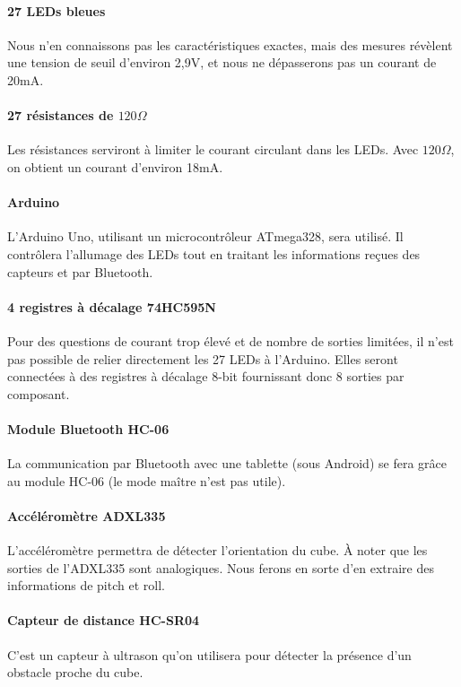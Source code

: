 \documentclass{article}
\begin{document}
\paragraph{27 LEDs bleues}
Nous n'en connaissons pas les caractéristiques exactes, mais des mesures révèlent une tension de seuil d'environ 2,9V, et nous ne dépasserons pas un courant de 20mA.

\paragraph{27 résistances de $120\Omega$}
Les résistances serviront à limiter le courant circulant dans les LEDs. Avec $120\Omega$, on obtient un courant d'environ 18mA.

\paragraph{Arduino}
L'Arduino Uno, utilisant un microcontrôleur ATmega328, sera utilisé. Il contrôlera l'allumage des LEDs tout en traitant les informations reçues des capteurs et par Bluetooth.

\paragraph{4 registres à décalage 74HC595N}
Pour des questions de courant trop élevé et de nombre de sorties limitées, il n'est pas possible de relier directement les 27 LEDs à l'Arduino. Elles seront connectées à des registres à décalage 8-bit fournissant donc 8 sorties par composant.

\paragraph{Module Bluetooth HC-06}
La communication par Bluetooth avec une tablette (sous Android) se fera grâce au module HC-06 (le mode maître n'est pas utile). 

\paragraph{Accéléromètre ADXL335}
L'accéléromètre permettra de détecter l'orientation du cube. À noter que les sorties de l'ADXL335 sont analogiques. Nous ferons en sorte d'en extraire des informations de pitch et roll.

\paragraph{Capteur de distance HC-SR04}
C'est un capteur à ultrason qu'on utilisera pour détecter la présence d'un obstacle proche du cube.
\end{document}
